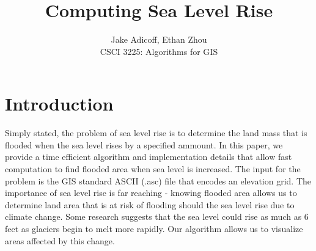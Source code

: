 \documentclass[]{scrartcl}
\date{}
\title{Computing Sea Level Rise}
\author{Jake Adicoff, Ethan Zhou \\ CSCI 3225: Algorithms for GIS}
\begin{document}
\maketitle
\bigskip


\section{Introduction} 
\indent \indent Simply stated, the problem of sea level rise is to determine the land mass that is flooded when the sea level rises by a specified ammount. In this paper, we provide a time efficient algorithm and implementation details that allow fast computation to find flooded area when sea level is increased. The input for the problem is the GIS standard ASCII (.asc) file that encodes an elevation grid. The importance of sea level rise is far reaching - knowing flooded area allows us to determine land area that is at risk of flooding should the sea level rise due to climate change. Some research suggests that the sea level could rise as much as 6 feet as glaciers begin to melt more rapidly. Our algorithm allows us to visualize areas affected by this change. \par
\end{document}
